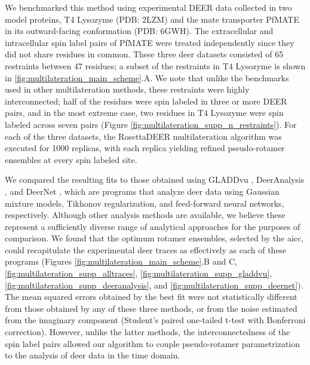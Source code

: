 We benchmarked this method using experimental DEER data collected in two model proteins, T4 Lysozyme \citep*{Islam2013, Weaver1987} (PDB: 2LZM) and the \gls{mate} transporter PfMATE \citep*{Jagessar2020, Tanaka2013} in its outward-facing conformation (PDB: 6GWH). The extracellular and intracellular spin label pairs of PfMATE were treated independently since they did not share residues in common. These three \gls{deer} datasets consisted of 65 restraints between 47 residues; a subset of the restraints in T4 Lysozyme is shown in \ref{fig:multilateration_main_scheme}.A. We note that unlike the benchmarks used in other multilateration methods, these restraints were highly interconnected; half of the residues were spin labeled in three or more DEER pairs, and in the most extreme case, two residues in T4 Lysozyme were spin labeled across seven pairs (Figure \ref{fig:multilateration_supp_n_restraints}). For each of the three datasets, the RosettaDEER multilateration algorithm was executed for 1000 replicas, with each replica yielding refined pseudo-rotamer ensembles at every spin labeled site.

We compared the resulting fits to those obtained using GLADDvu \citep*{Hustedt2018}, DeerAnalysis \citep*{Jeschke2006}, and DeerNet \citep*{Worswick2018}, which are programs that analyze \gls{deer} data using Gaussian mixture models, Tikhonov regularization, and feed-forward neural networks, respectively. Although other analysis methods are available, we believe these represent a sufficiently diverse range of analytical approaches for the purposes of comparison. We found that the optimum rotamer ensembles, selected by the \gls{aicc}, could recapitulate the experimental \gls{deer} traces as effectively as each of these programs (Figures \ref{fig:multilateration_main_scheme}.B and C, \ref{fig:multilateration_supp_alltraces}, \ref{fig:multilateration_supp_gladdvu}, \ref{fig:multilateration_supp_deeranalysis}, and \ref{fig:multilateration_supp_deernet}). The mean squared errors obtained by the best fit were not statistically different from those obtained by any of these three methods, or from the noise estimated from the imaginary component (Student’s paired one-tailed t-test with Bonferroni correction). However, unlike the latter methods, the interconnectedness of the spin label pairs allowed our algorithm to couple pseudo-rotamer parametrization to the analysis of \gls{deer} data in the time domain.

